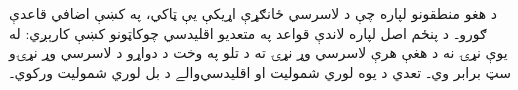 \documentclass[../../../include/open-logic-section]{subfiles}
\begin{document}


د هغو منطقونو لپاره چې د لاسرسي ځانګړې اړيکې يې ټاکي،
په  کښې اضافي قاعدې ګورو۔ د پنځم
اصل لپاره لاندې قواعد په متعديو اقليدسي چوکاټونو کښې کارېږي:
له يوې نړۍ نه د هغې هرې لاسرسي وړ نړۍ ته د تلو په وخت
د دواړو د لاسرسي وړ نړۍو سټ برابر وي۔ تعدي د يوه لوري
شموليت او اقليدسي‌والے د بل لوري شموليت ورکوي۔

\end{document}
